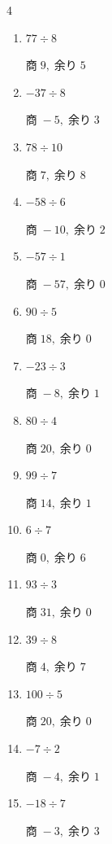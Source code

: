 \begin{multicols}{4}
\begin{enumerate}
        $商\; -2,\; 余り\; 1$

  \item $77 \div 8$

        $商\; 9,\; 余り\; 5$

  \item $-37 \div 8$

        $商\; -5,\; 余り\; 3$

  \item $78 \div 10$

        $商\; 7,\; 余り\; 8$

  \item $-58 \div 6$

        $商\; -10,\; 余り\; 2$

  \item $-57 \div 1$

        $商\; -57,\; 余り\; 0$

  \item $90 \div 5$

        $商\; 18,\; 余り\; 0$

  \item $-23 \div 3$

        $商\; -8,\; 余り\; 1$

  \item $80 \div 4$

        $商\; 20,\; 余り\; 0$

  \item $99 \div 7$

        $商\; 14,\; 余り\; 1$

  \item $6 \div 7$

        $商\; 0,\; 余り\; 6$

  \item $93 \div 3$

        $商\; 31,\; 余り\; 0$

  \item $39 \div 8$

        $商\; 4,\; 余り\; 7$

  \item $100 \div 5$

        $商\; 20,\; 余り\; 0$

  \item $-7 \div 2$

        $商\; -4,\; 余り\; 1$

  \item $-18 \div 7$

        $商\; -3,\; 余り\; 3$


\end{enumerate}
\end{multicols}
